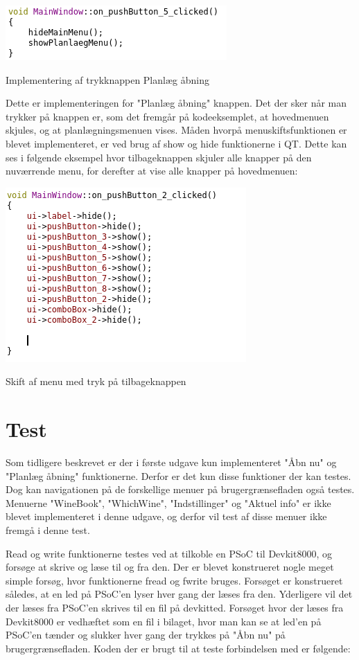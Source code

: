 \includegraphics{Billeder/pushButton}
\caption{Implementering af trykknappen Planlæg åbning}

Dette er implementeringen for "Planlæg åbning" knappen. Det der sker når man trykker på knappen er, som det fremgår på kodeeksemplet, at hovedmenuen skjules, og at planlægningsmenuen vises. 
Måden hvorpå menuskiftsfunktionen er blevet implementeret, er ved brug af show og hide funktionerne i QT. Dette kan ses i følgende eksempel hvor tilbageknappen skjuler alle knapper på den nuværrende menu, for derefter at vise alle knapper på hovedmenuen:

\includegraphics{Billeder/tilbageKnap}
\caption{Skift af menu med tryk på tilbageknappen}


\section*{Test}

Som tidligere beskrevet er der i første udgave kun implementeret "Åbn nu" og "Planlæg åbning" funktionerne. Derfor er det kun disse funktioner der kan testes. Dog kan navigationen på de forskellige menuer på brugergrænsefladen også testes. Menuerne "WineBook", "WhichWine", "Indstillinger" og "Aktuel info" er ikke blevet implementeret i denne udgave, og derfor vil test af disse menuer ikke fremgå i denne test.

Read og write funktionerne testes ved at tilkoble en PSoC til Devkit8000, og forsøge at skrive og læse til og fra den. Der er blevet konstrueret nogle meget simple forsøg, hvor funktionerne fread og fwrite bruges. Forsøget er konstrueret således, at en led på PSoC'en lyser hver gang der læses fra den. Yderligere vil det der læses fra PSoC'en skrives til en fil på devkitted. Forsøget hvor der læses fra Devkit8000 er vedhæftet som en fil i bilaget, hvor man kan se at led'en på PSoC'en tænder og slukker hver gang der trykkes på "Åbn nu" på brugergrænsefladen. Koden der er brugt til at teste forbindelsen med er følgende:


